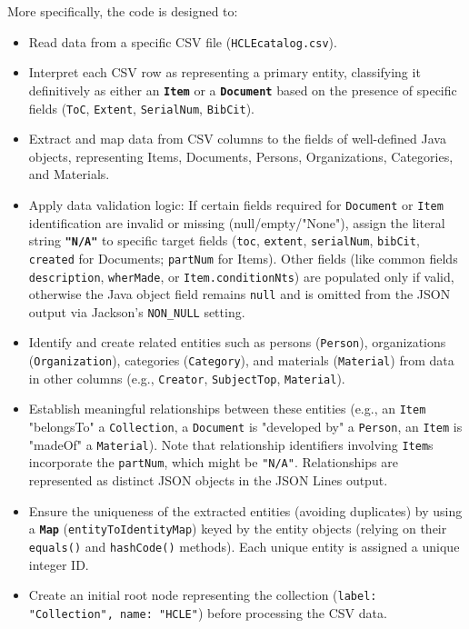 \documentclass[11pt, a4paper]{article}
\begin{document}
More specifically, the code is designed to:
\begin{itemize}
    \item Read data from a specific CSV file (\texttt{HCLEcatalog.csv}).
    \item Interpret each CSV row as representing a primary entity, classifying it definitively as either an \textbf{\texttt{Item}} or a \textbf{\texttt{Document}} based on the presence of specific fields (\texttt{ToC}, \texttt{Extent}, \texttt{SerialNum}, \texttt{BibCit}).
    \item Extract and map data from CSV columns to the fields of well-defined Java objects, representing Items, Documents, Persons, Organizations, Categories, and Materials.
    \item Apply data validation logic: If certain fields required for \texttt{Document} or \texttt{Item} identification are invalid or missing (null/empty/"None"), assign the literal string \textbf{\texttt{"N/A"}} to specific target fields (\texttt{toc}, \texttt{extent}, \texttt{serialNum}, \texttt{bibCit}, \texttt{created} for Documents; \texttt{partNum} for Items). Other fields (like common fields \texttt{description}, \texttt{wherMade}, or \texttt{Item.conditionNts}) are populated only if valid, otherwise the Java object field remains \texttt{null} and is omitted from the JSON output via Jackson's \texttt{NON\_NULL} setting.
    \item Identify and create related entities such as persons (\texttt{Person}), organizations (\texttt{Organization}), categories (\texttt{Category}), and materials (\texttt{Material}) from data in other columns (e.g., \texttt{Creator}, \texttt{SubjectTop}, \texttt{Material}).
    \item Establish meaningful relationships between these entities (e.g., an \texttt{Item} "belongsTo" a \texttt{Collection}, a \texttt{Document} is "developed by" a \texttt{Person}, an \texttt{Item} is "madeOf" a \texttt{Material}). Note that relationship identifiers involving \texttt{Item}s incorporate the \texttt{partNum}, which might be \texttt{"N/A"}. Relationships are represented as distinct JSON objects in the JSON Lines output.
    \item Ensure the uniqueness of the extracted entities (avoiding duplicates) by using a \textbf{\texttt{Map}} (\texttt{entityToIdentityMap}) keyed by the entity objects (relying on their \texttt{equals()} and \texttt{hashCode()} methods). Each unique entity is assigned a unique integer ID.
    \item Create an initial root node representing the collection (\texttt{label: "Collection", name: "HCLE"}) before processing the CSV data.

\end{itemize}
\end{document}
